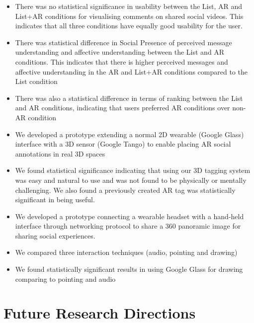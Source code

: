 \begin{itemize}
    \item{There was no statistical significance in usability between the List, AR and List+AR conditions for visualising comments on shared social videos. This indicates that all three conditions have equally good usability for the user.}
    \item{There was statistical difference in Social Presence of perceived message understanding and affective understanding between the List and AR conditions. This indicates that there is higher perceived messages and affective understanding in the AR and List+AR conditions compared to the List condition}
    \item{There was also a statistical difference in terms of ranking between the List and AR conditions, indicating that users preferred AR conditions over non-AR condition}
    \item{We developed a prototype extending a normal 2D wearable (Google Glass) interface with a 3D sensor (Google Tango) to enable placing AR social annotations in real 3D spaces}
    \item{We found statistical significance indicating that using our 3D tagging system was easy and natural to use and was not found to be physically or mentally challenging. We also found a previously created AR tag was statistically significant in being useful.}
    \item{We developed a prototype connecting a wearable headset with a hand-held interface through networking protocol to share a 360 panoramic image for sharing social experiences.}
    \item{We compared three interaction techniques (audio, pointing and drawing)}
    \item{We found statistically significant results in using Google Glass for drawing comparing to pointing and audio}
\end{itemize}



\section{Future Research Directions}


